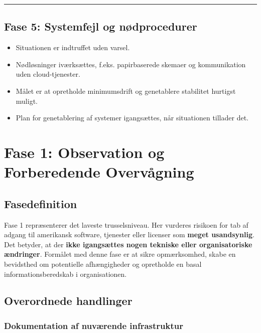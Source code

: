 \documentclass[a4paper,11pt]{book}
\begin{document}
\begin{center}\rule{0.5\linewidth}{0.5pt}\end{center}

\section{Fase 5: Systemfejl og
nødprocedurer}\label{fase-5-systemfejl-og-nuxf8dprocedurer}

\begin{itemize}
\tightlist
\item
  Situationen er indtruffet uden varsel.
\item
  Nødløsninger iværksættes, f.eks. papirbaserede skemaer og
  kommunikation uden cloud-tjenester.
\item
  Målet er at opretholde minimumsdrift og genetablere stabilitet
  hurtigst muligt.
\item
  Plan for genetablering af systemer igangsættes, når situationen
  tillader det.
\end{itemize}

\newpage

\chapter{Fase 1: Observation og Forberedende
Overvågning}\label{fase-1-observation-og-forberedende-overvuxe5gning}

\section{Fasedefinition}\label{fasedefinition}

Fase 1 repræsenterer det laveste trusselsniveau. Her vurderes risikoen
for tab af adgang til amerikansk software, tjenester eller licenser som
\textbf{meget usandsynlig}. Det betyder, at der \textbf{ikke igangsættes
nogen tekniske eller organisatoriske ændringer}. Formålet med denne fase
er at sikre opmærksomhed, skabe en bevidsthed om potentielle
afhængigheder og opretholde en basal informationsberedskab i
organisationen.

\section{Overordnede handlinger}\label{overordnede-handlinger}

\subsection{Dokumentation af nuværende
infrastruktur}\label{dokumentation-af-nuvuxe6rende-infrastruktur}
\end{document}
